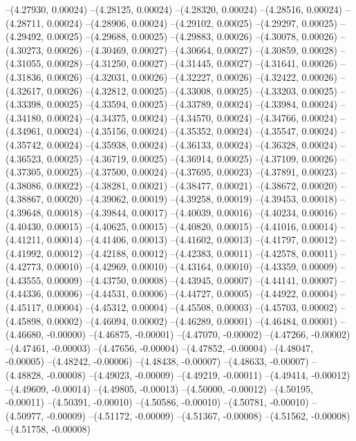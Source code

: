 --(4.27930, 0.00024)
--(4.28125, 0.00024)
--(4.28320, 0.00024)
--(4.28516, 0.00024)
--(4.28711, 0.00024)
--(4.28906, 0.00024)
--(4.29102, 0.00025)
--(4.29297, 0.00025)
--(4.29492, 0.00025)
--(4.29688, 0.00025)
--(4.29883, 0.00026)
--(4.30078, 0.00026)
--(4.30273, 0.00026)
--(4.30469, 0.00027)
--(4.30664, 0.00027)
--(4.30859, 0.00028)
--(4.31055, 0.00028)
--(4.31250, 0.00027)
--(4.31445, 0.00027)
--(4.31641, 0.00026)
--(4.31836, 0.00026)
--(4.32031, 0.00026)
--(4.32227, 0.00026)
--(4.32422, 0.00026)
--(4.32617, 0.00026)
--(4.32812, 0.00025)
--(4.33008, 0.00025)
--(4.33203, 0.00025)
--(4.33398, 0.00025)
--(4.33594, 0.00025)
--(4.33789, 0.00024)
--(4.33984, 0.00024)
--(4.34180, 0.00024)
--(4.34375, 0.00024)
--(4.34570, 0.00024)
--(4.34766, 0.00024)
--(4.34961, 0.00024)
--(4.35156, 0.00024)
--(4.35352, 0.00024)
--(4.35547, 0.00024)
--(4.35742, 0.00024)
--(4.35938, 0.00024)
--(4.36133, 0.00024)
--(4.36328, 0.00024)
--(4.36523, 0.00025)
--(4.36719, 0.00025)
--(4.36914, 0.00025)
--(4.37109, 0.00026)
--(4.37305, 0.00025)
--(4.37500, 0.00024)
--(4.37695, 0.00023)
--(4.37891, 0.00023)
--(4.38086, 0.00022)
--(4.38281, 0.00021)
--(4.38477, 0.00021)
--(4.38672, 0.00020)
--(4.38867, 0.00020)
--(4.39062, 0.00019)
--(4.39258, 0.00019)
--(4.39453, 0.00018)
--(4.39648, 0.00018)
--(4.39844, 0.00017)
--(4.40039, 0.00016)
--(4.40234, 0.00016)
--(4.40430, 0.00015)
--(4.40625, 0.00015)
--(4.40820, 0.00015)
--(4.41016, 0.00014)
--(4.41211, 0.00014)
--(4.41406, 0.00013)
--(4.41602, 0.00013)
--(4.41797, 0.00012)
--(4.41992, 0.00012)
--(4.42188, 0.00012)
--(4.42383, 0.00011)
--(4.42578, 0.00011)
--(4.42773, 0.00010)
--(4.42969, 0.00010)
--(4.43164, 0.00010)
--(4.43359, 0.00009)
--(4.43555, 0.00009)
--(4.43750, 0.00008)
--(4.43945, 0.00007)
--(4.44141, 0.00007)
--(4.44336, 0.00006)
--(4.44531, 0.00006)
--(4.44727, 0.00005)
--(4.44922, 0.00004)
--(4.45117, 0.00004)
--(4.45312, 0.00004)
--(4.45508, 0.00003)
--(4.45703, 0.00002)
--(4.45898, 0.00002)
--(4.46094, 0.00002)
--(4.46289, 0.00001)
--(4.46484, 0.00001)
--(4.46680, -0.00000)
--(4.46875, -0.00001)
--(4.47070, -0.00002)
--(4.47266, -0.00002)
--(4.47461, -0.00003)
--(4.47656, -0.00004)
--(4.47852, -0.00004)
--(4.48047, -0.00005)
--(4.48242, -0.00006)
--(4.48438, -0.00007)
--(4.48633, -0.00007)
--(4.48828, -0.00008)
--(4.49023, -0.00009)
--(4.49219, -0.00011)
--(4.49414, -0.00012)
--(4.49609, -0.00014)
--(4.49805, -0.00013)
--(4.50000, -0.00012)
--(4.50195, -0.00011)
--(4.50391, -0.00010)
--(4.50586, -0.00010)
--(4.50781, -0.00010)
--(4.50977, -0.00009)
--(4.51172, -0.00009)
--(4.51367, -0.00008)
--(4.51562, -0.00008)
--(4.51758, -0.00008)
